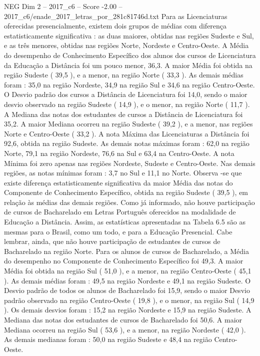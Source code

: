 \begin{textsample}{NEG Dim 2 – 2017\_c6 – Score -2.00 – 2017\_c6/enade\_2017\_letras\_por\_281c81746d.txt}
Para as Licenciaturas oferecidas presencialmente, existem dois grupos de médias com diferença estatisticamente significativa : as duas maiores, obtidas nas regiões Sudeste e Sul, e as três menores, obtidas nas regiões Norte, Nordeste e Centro-Oeste.
A Média do desempenho de Conhecimento Específico dos alunos dos cursos de Licenciatura da Educação a Distância foi um pouco menor, 36,3.
A maior Média foi obtida na região Sudeste ( 39,5 ), e a menor, na região Norte ( 33,3 ).
As demais médias foram : 35,0 na região Nordeste, 34,9 na região Sul e 34,6 na região Centro-Oeste.
O Desvio padrão dos cursos a Distância de Licenciatura foi 14,0, sendo o maior desvio observado na região Sudeste ( 14,9 ), e o menor, na região Norte ( 11,7 ).
A Mediana das notas dos estudantes de cursos a Distância de Licenciatura foi 35,2.
A maior Mediana ocorreu na região Sudeste ( 39,2 ), e a menor, nas regiões Norte e Centro-Oeste ( 33,2 ).
A nota Máxima das Licenciaturas a Distância foi 92,6, obtida na região Sudeste.
As demais notas máximas foram : 62,0 na região Norte, 79,1 na região Nordeste, 76,6 na Sul e 63,4 na Centro-Oeste.
A nota Mínima foi zero apenas nas regiões Nordeste, Sudeste e Centro-Oeste.
Nas demais regiões, as notas mínimas foram : 3,7 no Sul e 11,1 no Norte.
Observa -se que existe diferença estatisticamente significativa da maior Média das notas do Componente de Conhecimento Específico, obtida na região Sudeste ( 39,5 ), em relação às médias das demais regiões.
Como já informado, não houve participação de cursos de Bacharelado em Letras Português oferecidos na modalidade de Educação a Distância.
Assim, as estatísticas apresentadas na Tabela 6.5 são as mesmas para o Brasil, como um todo, e para a Educação Presencial.
Cabe lembrar, ainda, que não houve participação de estudantes de cursos de Bacharelado na região Norte.
Para os alunos de cursos de Bacharelado, a Média do desempenho no Componente de Conhecimento Específico foi 49,3.
A maior Média foi obtida na região Sul ( 51,0 ), e a menor, na região Centro-Oeste ( 45,1 ).
As demais médias foram : 49,5 na região Nordeste e 49,1 na região Sudeste.
O Desvio padrão de todos os alunos de Bacharelado foi 15,9, sendo o maior Desvio padrão observado na região Centro-Oeste ( 19,8 ), e o menor, na região Sul ( 14,9 ).
Os demais desvios foram : 15,2 na região Nordeste e 15,9 na região Sudeste.
A Mediana das notas dos estudantes de cursos de Bacharelado foi 50,6.
A maior Mediana ocorreu na região Sul ( 53,6 ), e a menor, na região Nordeste ( 42,0 ).
As demais medianas foram : 50,0 na região Sudeste e 48,4 na região Centro-Oeste.

\end{textsample}
